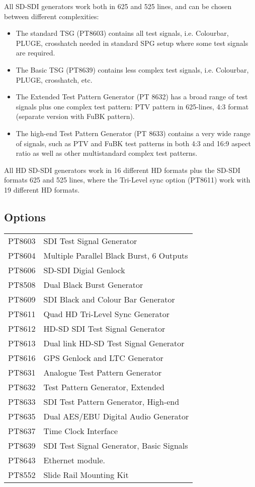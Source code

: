 All SD-SDI generators work both in 625 and 525 lines, and can be chosen between different complexities:
\begin{itemize}
\item The standard TSG (PT8603) contains all test signals, i.e. Colourbar, PLUGE, crosshatch needed in standard SPG setup where some test signals are required.
\item The Basic TSG (PT8639) contains less complex test signals, i.e. Colourbar, PLUGE, crosshatch, etc.
\item The Extended Test Pattern Generator (PT 8632) has a broad range of test signals plus one complex test pattern: PTV pattern in 625-lines, 4:3 format (separate version with FuBK pattern).
\item The high-end Test Pattern Generator (PT 8633) contains a very wide range of signals, such as PTV and FuBK test patterns in both 4:3 and 16:9 aspect ratio as well as other multistandard complex test patterns.
\end{itemize}

All HD SD-SDI generators work in 16 different HD formats plus the SD-SDI formats 625 and 525 lines, where the Tri-Level sync option (PT8611) work with 19 different HD formats.

\subsection{Options}
\begin{tabular}{l l}
	PT8603 & SDI Test Signal Generator\\
	PT8604 & Multiple Parallel Black Burst, 6 Outputs\\
	PT8606 & SD-SDI Digial Genlock\\
	PT8508 & Dual Black Burst Generator\\
	PT8609 & SDI Black and Colour Bar Generator\\
	PT8611 & Quad HD Tri-Level Sync Generator\\
	PT8612 & HD-SD SDI Test Signal Generator\\
	PT8613 & Dual link HD-SD Test Signal Generator\\
	PT8616 & GPS Genlock and LTC Generator\\
	PT8631 & Analogue Test Pattern Generator\\
	PT8632 & Test Pattern Generator, Extended\\
	PT8633 & SDI Test Pattern Generator, High-end\\
	PT8635 & Dual AES/EBU Digital Audio Generator\\
	PT8637 & Time Clock Interface\\
	PT8639 & SDI Test Signal Generator, Basic Signals\\
	PT8643 & Ethernet module.\\
	\rule{0pt}{4ex}
	PT8552 & Slide Rail Mounting Kit\\
\end{tabular}

